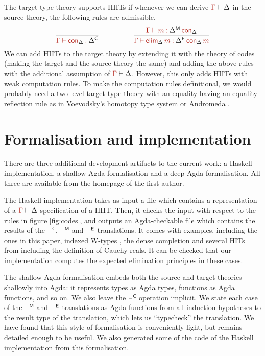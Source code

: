 \documentclass[a4paper,UKenglish]{lipics-v2018}
\newcommand{\blank}{\mathord{\hspace{1pt}\text{--}\hspace{1pt}}} %
\newcommand{\C}{\mathsf{C}}
\newcommand{\M}{\mathsf{M}}
\newcommand{\elim}{\mathsf{elim}}
\newcommand{\1}{\mathsf{1}} \renewcommand{\Pr}{\mathsf{Pr}}
\newcommand{\con}{\mathsf{con}}
\renewcommand{\in}{\mathbin{\hat:}}
\renewcommand{\hat}[1]{{\color{BrickRed}{#1}}}
\newcommand{\vdashh}{\mathbin{\hat\vdash}}
\begin{document}
The target type theory supports HIITs if whenever we can derive
$\hat{\Gamma}\vdash\Delta$ in the source theory, the following rules are
admissible.
\[
\infer{\hat{\Gamma}\vdashh\hat{\con}_\Delta\in \Delta^\C}{\vspace{1em}}
\hspace{5em}
\infer{\hat{\Gamma}\vdashh\hat{\elim}_\Delta\,\hat{m}\in\Delta^\E\,\hat{\con}_\Delta\,\hat{m}}{\hat{\Gamma}\vdashh \hat{m}\in \Delta^\M\,\hat{\con}_\Delta}
\]
We can add HIITs to the target theory by extending it with the theory
of codes (making the target and the source theory the same) and adding
the above rules with the additional assumption of
$\hat{\Gamma}\vdash\Delta$. However, this only adds HIITs with weak
computation rules. To make the computation rules definitional, we
would probably need a two-level target type theory with an equality
having an equality reflection rule as in Voevodsky's homotopy type
system \cite{hts} or Andromeda \cite{andromeda}.


\section{Formalisation and implementation}
\label{sec:formalisation}

There are three additional development artifacts to the current work:
a Haskell implementation, a shallow Agda formalisation and a deep Agda
formalisation. All three are available from the homepage of the first
author.

The Haskell implementation takes as input a file which contains a
representation of a $\hat{\Gamma}\vdash\Delta$ specification of a
HIIT. Then, it checks the input with respect to the rules in figure
\ref{fig:codes}, and outputs an Agda-checkable file which contains the
results of the $\blank^\C$, $\blank^\M$ and $\blank^\E$
translations. It comes with examples, including the ones in this
paper, indexed W-types \cite{morris09indexed}, the dense completion
\cite[Appendix A.1.3]{forsberg-phd} and several HITs from
\cite{HoTTbook} including the definition of Cauchy reals. It can be
checked that our implementation computes the expected elimination
principles in these cases.

The shallow Agda formalisation embeds both the source and target theories
shallowly into Agda: it represents types as Agda types, functions as
Agda functions, and so on. We also leave the $\blank^\C$ operation
implicit. We state each case of the $\blank^\M$ and $\blank^\E$
translations as Agda functions from all induction hypotheses to the
result type of the translation, which lets us ``typecheck'' the
translation. We have found that this style of formalisation is
conveniently light, but remains detailed enough to be useful. We also
generated some of the code of the Haskell implementation from this
formalisation.
\end{document}
